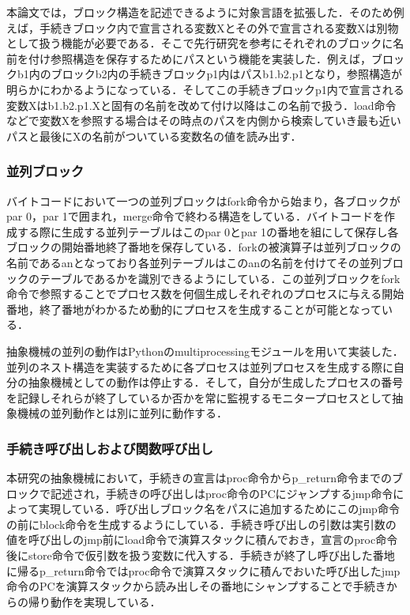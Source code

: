 \documentclass[submit,PRO]{ipsj}
\begin{document}
本論文では，ブロック構造を記述できるように対象言語を拡張した．そのため例えば，手続きブロック内で宣言される変数Xとその外で宣言される変数Xは別物として扱う機能が必要である．そこで先行研究を参考にそれぞれのブロックに名前を付け参照構造を保存するためにパスという機能を実装した．例えば，ブロックb1内のブロックb2内の手続きブロックp1内はパスb1.b2.p1となり，参照構造が明らかにわかるようになっている．そしてこの手続きブロックp1内で宣言される変数Xはb1.b2.p1.Xと固有の名前を改めて付け以降はこの名前で扱う．load命令などで変数Xを参照する場合はその時点のパスを内側から検索していき最も近いパスと最後にXの名前がついている変数名の値を読み出す．


\subsubsection{並列ブロック}

バイトコードにおいて一つの並列ブロックはfork命令から始まり，各ブロックがpar 0，par 1で囲まれ，merge命令で終わる構造をしている．バイトコードを作成する際に生成する並列テーブルはこのpar 0とpar 1の番地を組にして保存し各ブロックの開始番地終了番地を保存している．forkの被演算子は並列ブロックの名前であるanとなっており各並列テーブルはこのanの名前を付けてその並列ブロックのテーブルであるかを識別できるようにしている．この並列ブロックをfork命令で参照することでプロセス数を何個生成しそれぞれのプロセスに与える開始番地，終了番地がわかるため動的にプロセスを生成することが可能となっている．

抽象機械の並列の動作はPythonのmultiprocessingモジュールを用いて実装した．並列のネスト構造を実装するために各プロセスは並列プロセスを生成する際に自分の抽象機械としての動作は停止する．そして，自分が生成したプロセスの番号を記録しそれらが終了しているか否かを常に監視するモニタープロセスとして抽象機械の並列動作とは別に並列に動作する．


\subsubsection{手続き呼び出しおよび関数呼び出し}

本研究の抽象機械において，手続きの宣言はproc命令からp\_return命令までのブロックで記述され，手続きの呼び出しはproc命令のPCにジャンプするjmp命令によって実現している．呼び出しブロック名をパスに追加するためにこのjmp命令の前にblock命令を生成するようにしている．手続き呼び出しの引数は実引数の値を呼び出しのjmp前にload命令で演算スタックに積んでおき，宣言のproc命令後にstore命令で仮引数を扱う変数に代入する．手続きが終了し呼び出した番地に帰るp\_return命令ではproc命令で演算スタックに積んでおいた呼び出したjmp命令のPCを演算スタックから読み出しその番地にシャンプすることで手続きからの帰り動作を実現している．
\end{document}
